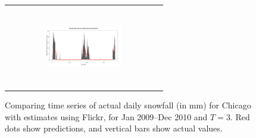 






\begin{figure}
\begin{center}
\begin{tabular}{c}
\includegraphics[width=0.5\textwidth,height=1.4in,clip,trim=0 0.5in 0in 0.6in]{plots/chicago_noaa_vs_prediction_prev_3.png} 
\end{tabular}
\end{center}
\vspace{-24pt}
\caption{Comparing time series of actual daily snowfall (in mm) for Chicago with estimates using Flickr, for Jan 2009--Dec 2010 and $T=3$. Red dots show predictions, and vertical bars show actual values.}
\label{fig:prediction_vis}
\vspace{-12pt}
\end{figure}


